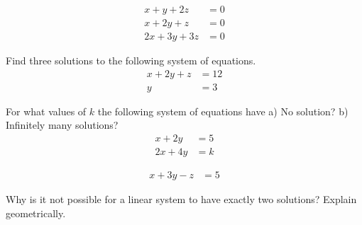 \begin{puzzle}
    \begin{align*}
        x + y + 2z   & = 0 \\
        x + 2y + z   & = 0 \\
        2x + 3y + 3z & = 0
    \end{align*}
\end{puzzle}

\begin{puzzle}
    Find three solutions to the following system of equations.
    \begin{align*}
        x + 2y + z & = 12 \\
        y          & = 3
    \end{align*}
\end{puzzle}

\begin{puzzle}
    For what values of \( k \) the following system of equations have a) No solution? b) Infinitely many solutions?
    \begin{align*}
        x + 2y  & = 5 \\
        2x + 4y & = k
    \end{align*}
\end{puzzle}

\begin{puzzle}
    \begin{align*}
        x + 3y - z & = 5
    \end{align*}
\end{puzzle}

\begin{puzzle}
    Why is it not possible for a linear system to have exactly two solutions? Explain geometrically.
\end{puzzle}